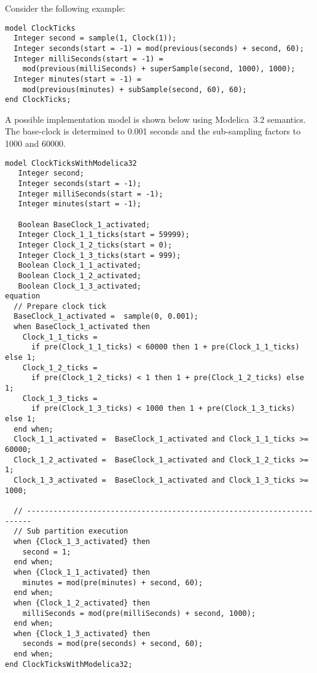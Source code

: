 \begin{nonnormative}
Consider the following example:
\begin{lstlisting}[language=modelica]
model ClockTicks
  Integer second = sample(1, Clock(1));
  Integer seconds(start = -1) = mod(previous(seconds) + second, 60);
  Integer milliSeconds(start = -1) =
    mod(previous(milliSeconds) + superSample(second, 1000), 1000);
  Integer minutes(start = -1) =
    mod(previous(minutes) + subSample(second, 60), 60);
end ClockTicks;
\end{lstlisting}

A possible implementation model is shown below using Modelica~3.2 semantics.  The base-clock is determined to 0.001 seconds and the sub-sampling factors to 1000 and 60000.

\begin{lstlisting}[language=modelica]
model ClockTicksWithModelica32
   Integer second;
   Integer seconds(start = -1);
   Integer milliSeconds(start = -1);
   Integer minutes(start = -1);

   Boolean BaseClock_1_activated;
   Integer Clock_1_1_ticks(start = 59999);
   Integer Clock_1_2_ticks(start = 0);
   Integer Clock_1_3_ticks(start = 999);
   Boolean Clock_1_1_activated;
   Boolean Clock_1_2_activated;
   Boolean Clock_1_3_activated;
equation
  // Prepare clock tick
  BaseClock_1_activated =  sample(0, 0.001);
  when BaseClock_1_activated then
    Clock_1_1_ticks =
      if pre(Clock_1_1_ticks) < 60000 then 1 + pre(Clock_1_1_ticks) else 1;
    Clock_1_2_ticks =
      if pre(Clock_1_2_ticks) < 1 then 1 + pre(Clock_1_2_ticks) else 1;
    Clock_1_3_ticks =
      if pre(Clock_1_3_ticks) < 1000 then 1 + pre(Clock_1_3_ticks) else 1;
  end when;
  Clock_1_1_activated =  BaseClock_1_activated and Clock_1_1_ticks >= 60000;
  Clock_1_2_activated =  BaseClock_1_activated and Clock_1_2_ticks >= 1;
  Clock_1_3_activated =  BaseClock_1_activated and Clock_1_3_ticks >= 1000;

  // -----------------------------------------------------------------------
  // Sub partition execution
  when {Clock_1_3_activated} then
    second = 1;
  end when;
  when {Clock_1_1_activated} then
    minutes = mod(pre(minutes) + second, 60);
  end when;
  when {Clock_1_2_activated} then
    milliSeconds = mod(pre(milliSeconds) + second, 1000);
  end when;
  when {Clock_1_3_activated} then
    seconds = mod(pre(seconds) + second, 60);
  end when;
end ClockTicksWithModelica32;
\end{lstlisting}
\end{nonnormative}
